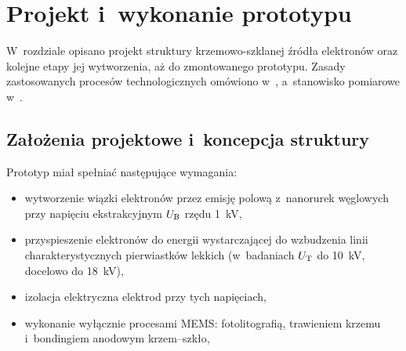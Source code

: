 \chapter{Projekt i~wykonanie prototypu}
\label{ch:projekt}

W~rozdziale opisano projekt struktury krzemowo-szklanej źródła elektronów
oraz kolejne etapy jej wytworzenia, aż do zmontowanego prototypu. Zasady
zastosowanych procesów technologicznych omówiono w~,
a~stanowisko pomiarowe w~.

\section{Założenia projektowe i~koncepcja struktury}
\label{sec:koncepcja}

Prototyp miał spełniać następujące wymagania:
\begin{itemize}
  \item wytworzenie wiązki elektronów przez emisję polową z~nanorurek
        węglowych przy napięciu ekstrakcyjnym $U_\mathrm{B}$ rzędu \SI{1}{\kilo\volt},
  \item przyspieszenie elektronów do energii wystarczającej do wzbudzenia
        linii charakterystycznych pierwiastków lekkich (w~badaniach
        $U_\mathrm{T}$ do \SI{10}{\kilo\volt}, docelowo do \SI{18}{\kilo\volt}),
  \item izolacja elektryczna elektrod przy tych napięciach,
  \item wykonanie wyłącznie procesami MEMS: fotolitografią, trawieniem
        krzemu i~bondingiem anodowym krzem--szkło,
\end{itemize}

